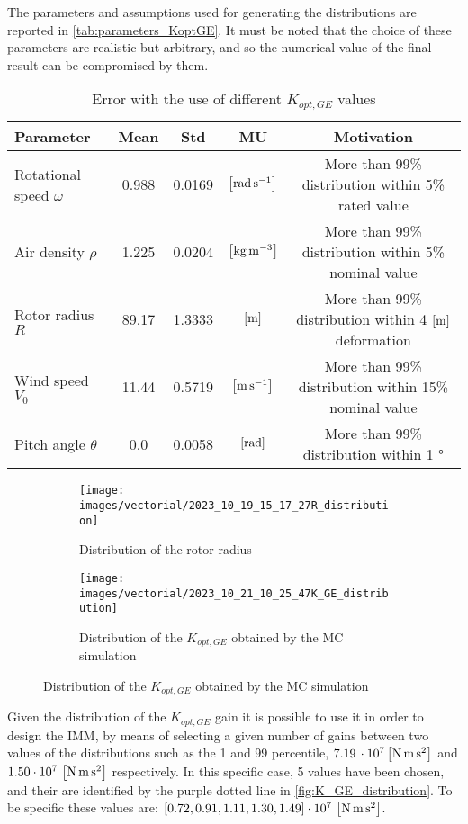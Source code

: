 The parameters and assumptions used for generating the distributions are reported in \autoref{tab:parameters_KoptGE}. It must be noted that the choice of these parameters are realistic but arbitrary, and so the numerical value of the final result can be compromised by them.

\begin{table}[htb]
  \caption{Error with the use of different $K_{opt,GE}$ values}
  \centering
  \begin{tabular}{lcccc}
  \toprule
  Parameter & Mean & Std & MU & Motivation\\ \midrule
  Rotational speed $\omega$ & 0.988 & 0.0169 & $\left[\si{\radian\per\second}\right]$ & More than 99\% distribution within 5\% rated value\\
  Air density $\rho$ &  1.225 & 0.0204 & $\left[\si{\kilo\gram\per\cubic\meter}\right]$ & More than 99\% distribution within 5\% nominal value \\
  Rotor radius $R$  & 89.17 & 1.3333 & $\left[\si{\meter}\right]$ & More than 99\% distribution within 4 $\left[\si{\meter}\right]$ deformation \\
  Wind speed $V_0$  & 11.44 & 0.5719 & $\left[\si{\meter\per\second}\right]$ & More than 99\% distribution within 15\% nominal value \\
  Pitch angle $\theta$ & 0.0 & 0.0058 & $\left[\si{\radian}\right]$ & More than 99\% distribution within  1 $\si{\degree}$ \\
 \bottomrule
  \end{tabular}
  \label{tab:parameters_KoptGE}
\end{table}

\begin{figure}[H]
  \centering
  \begin{subfigure}{0.65\columnwidth}
    \centering
    \texttt{[image: images/vectorial/2023\_10\_19\_15\_17\_27R\_distribution]}
    \caption{Distribution of the rotor radius}
    \label{fig:R_distribution}
  \end{subfigure}
  \begin{subfigure}{0.65\columnwidth}
    \centering
    \texttt{[image: images/vectorial/2023\_10\_21\_10\_25\_47K\_GE\_distribution]}
    \caption{Distribution of the $K_{opt,GE}$ obtained by the \acrshort{MC} simulation}
    \label{fig:K_GE_distribution}
  \end{subfigure}
\end{figure}

Given the distribution of the $K_{opt,GE}$ gain it is possible to use it in order to design the IMM, by means of selecting a given number of gains between two values of the distributions such as the 1 and 99 percentile, $7.19 \, \cdot 10^7 \left[\si{\newton \meter \square \second}\right]$ and $1.50 \cdot 10^7 \, \left[\si{\newton \meter \square \second}\right]$ respectively. In this specific case, 5 values have been chosen, and their are identified by the purple dotted line in \autoref{fig:K_GE_distribution}. To be specific these values are: $\left[0.72, 0.91, 1.11, 1.30, 1.49 \right] \cdot 10^7 \, \left[\si{\newton\meter\square\second}\right]$. 

